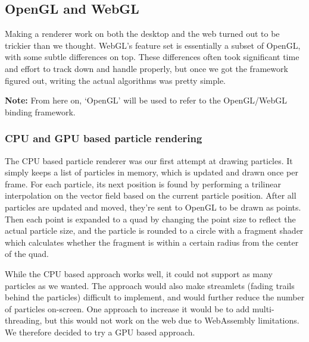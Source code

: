 \documentclass{article}
\begin{document}
\subsection*{OpenGL and WebGL}

Making a renderer work on both the desktop and the web turned out to be trickier than we thought. WebGL's feature set is essentially a subset of OpenGL, with some subtle differences on top. These differences often took significant time and effort to track down and handle properly, but once we got the framework figured out, writing the actual algorithms was pretty simple.

\textbf{Note:} From here on, `OpenGL' will be used to refer to the OpenGL/WebGL binding framework.

\subsubsection*{CPU and GPU based particle rendering}

The CPU based particle renderer was our first attempt at drawing particles. It simply keeps a list of particles in memory, which is updated and drawn once per frame. For each particle, its next position is found by performing a trilinear interpolation on the vector field based on the current particle position. After all particles are updated and moved, they're sent to OpenGL to be drawn as points. Then each point is expanded to a quad by changing the point size to reflect the actual particle size, and the particle is rounded to a circle with a fragment shader which calculates whether the fragment is within a certain radius from the center of the quad.

While the CPU based approach works well, it could not support as many particles as we wanted. The approach would also make streamlets (fading trails behind the particles) difficult to implement, and would further reduce the number of particles on-screen. One approach to increase it would be to add multi-threading, but this would not work on the web due to WebAssembly limitations. We therefore decided to try a GPU based approach.
\end{document}

